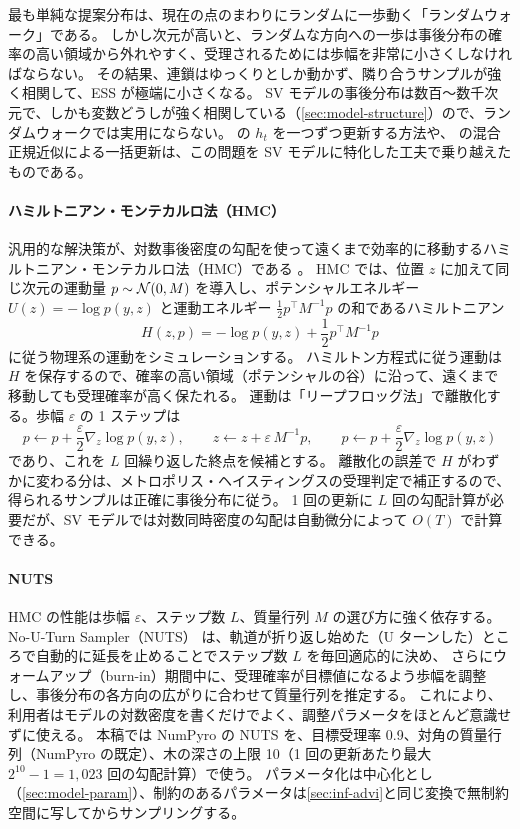最も単純な提案分布は、現在の点のまわりにランダムに一歩動く「ランダムウォーク」である。
しかし次元が高いと、ランダムな方向への一歩は事後分布の確率の高い領域から外れやすく、受理されるためには歩幅を非常に小さくしなければならない。
その結果、連鎖はゆっくりとしか動かず、隣り合うサンプルが強く相関して、ESS が極端に小さくなる。
SV モデルの事後分布は数百〜数千次元で、しかも変数どうしが強く相関している（\cref{sec:model-structure}）ので、ランダムウォークでは実用にならない。
\textcite{jacquier1994} の $h_t$ を一つずつ更新する方法や、\textcite{kim1998} の混合正規近似による一括更新は、この問題を SV モデルに特化した工夫で乗り越えたものである。

\paragraph{ハミルトニアン・モンテカルロ法（HMC）}
汎用的な解決策が、対数事後密度の勾配を使って遠くまで効率的に移動するハミルトニアン・モンテカルロ法（HMC）である \parencite{duane1987,neal2011,betancourt2017}。
HMC では、位置 $z$ に加えて同じ次元の運動量 $p \sim \mathcal{N}(0, M)$ を導入し、ポテンシャルエネルギー $U(z) = -\log p(y, z)$ と運動エネルギー $\frac{1}{2} p^\top M^{-1} p$ の和であるハミルトニアン
\[
  H(z, p) = -\log p(y, z) + \frac{1}{2} p^\top M^{-1} p
\]
に従う物理系の運動をシミュレーションする。
ハミルトン方程式に従う運動は $H$ を保存するので、確率の高い領域（ポテンシャルの谷）に沿って、遠くまで移動しても受理確率が高く保たれる。
運動は「リープフロッグ法」で離散化する。歩幅 $\varepsilon$ の 1 ステップは
\[
  p \leftarrow p + \frac{\varepsilon}{2} \nabla_z \log p(y, z), \qquad
  z \leftarrow z + \varepsilon\, M^{-1} p, \qquad
  p \leftarrow p + \frac{\varepsilon}{2} \nabla_z \log p(y, z)
\]
であり、これを $L$ 回繰り返した終点を候補とする。
離散化の誤差で $H$ がわずかに変わる分は、メトロポリス・ヘイスティングスの受理判定で補正するので、得られるサンプルは正確に事後分布に従う。
1 回の更新に $L$ 回の勾配計算が必要だが、SV モデルでは対数同時密度の勾配は自動微分によって $O(T)$ で計算できる。

\paragraph{NUTS}
HMC の性能は歩幅 $\varepsilon$、ステップ数 $L$、質量行列 $M$ の選び方に強く依存する。
No-U-Turn Sampler（NUTS）\parencite{hoffman2014} は、軌道が折り返し始めた（U ターンした）ところで自動的に延長を止めることでステップ数 $L$ を毎回適応的に決め、
さらにウォームアップ（burn-in）期間中に、受理確率が目標値になるよう歩幅を調整し、事後分布の各方向の広がりに合わせて質量行列を推定する。
これにより、利用者はモデルの対数密度を書くだけでよく、調整パラメータをほとんど意識せずに使える。
本稿では NumPyro \parencite{phan2019} の NUTS を、目標受理率 0.9、対角の質量行列（NumPyro の既定）、木の深さの上限 10（1 回の更新あたり最大 $2^{10} - 1 = 1{,}023$ 回の勾配計算）で使う。
パラメータ化は中心化とし（\cref{sec:model-param}）、制約のあるパラメータは\cref{sec:inf-advi}と同じ変換で無制約空間に写してからサンプリングする。

